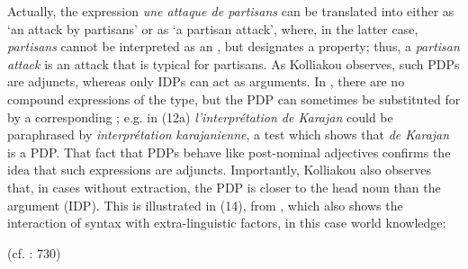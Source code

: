 \documentclass[output=paper]{langsci/langscibook}
\begin{document}
Actually, the  expression \textit{une attaque de partisans} can be translated into  either as ‘an attack by partisans’ or as ‘a partisan attack’, where, in the latter case, \textit{partisans} cannot be interpreted as an \AGENT, but designates a property; thus, a \textit{partisan attack} is an attack that is typical for partisans. As Kolliakou observes, such PDPs are adjuncts, whereas only IDPs can act as arguments. In , there are no compound expressions of the  type, but the PDP can sometimes be substituted for by a corresponding ; e.g. in (12a) \textit{l’interprétation de Karajan} could be paraphrased by \textit{interprétation} \textit{karajanienne}, a test which shows that \textit{de Karajan} is a PDP. That fact that PDPs behave like post-nominal adjectives confirms the idea that such expressions are adjuncts. Importantly, Kolliakou also observes that, in cases without extraction, the PDP is closer to the head noun than the argument (IDP). This is illustrated in (14), from \citet[714]{Kolliakou1999}, which also shows the interaction of syntax with extra-linguistic factors, in this case world knowledge:

\ea%
    \label{ex:mensch:14}
    \glt (cf. \citealt{Kolliakou1999}: 730)
    \z
\z    
\end{document}
